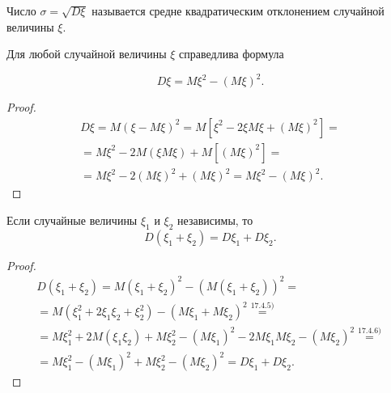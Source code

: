 \begin{definition}
Число $\sigma = \sqrt{D\xi}$ называется средне квадратическим отклонением случайной величины $\xi$.	
\end{definition}

\begin{theorem}
	Для любой случайной величины $\xi$ справедлива формула

\begin{equation*}
	D\xi = M\xi^2 − (M\xi)^2 .
\end{equation*}

\end{theorem}

\begin{proof}

	\begin{gather*}
		D\xi = M(\xi − M\xi)^2 = M[\xi^2 − 2\xi M\xi + (M\xi)^2] =\\= M\xi^2 − 2M(\xi M\xi) + M[(M\xi)^2 ] =\\= M\xi^2 − 2(M\xi)^2 + (M\xi)^2 = M\xi^2 − (M\xi)^2 .
	\end{gather*}

\end{proof}

\begin{theorem}
 Если случайные величины $\xi_1$ и $\xi_2$ независимы, то
$$D(\xi_1 + \xi_2 ) = D\xi_1 + D\xi_2 .$$
 \end{theorem} 

\begin{proof}
 	\begin{gather*}
 		D(\xi_1 + \xi_2 ) = M(\xi_1 + \xi_2 )^2 − (M(\xi_1 + \xi_2 ))^2 =\\= M(\xi_1^2 + 2\xi_1 \xi_2 + \xi_2^2 ) - (M\xi_1 + M\xi_2 )^2 \stackrel{17.4.5)}{=}\\= M\xi_1^2 + 2M(\xi_1 \xi_2 ) + M\xi_2^2 − (M\xi_1)^2 − 2M\xi_1 M\xi_2 − (M\xi_2 )^2  \stackrel{17.4.6)}{=}\\= M\xi_1^2 − (M\xi_1 )^2 + M\xi_2^2 − (M\xi_2 )^2 = D\xi_1 + D\xi_2 .
 	\end{gather*}
 \end{proof} 
 
